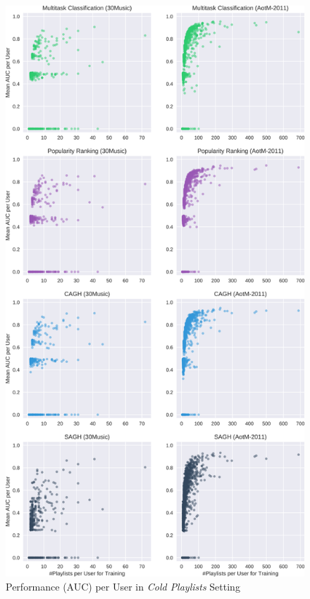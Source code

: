 \begin{figure}[!t]
    \centering
    \includegraphics[height=\textheight]{fig/auc_per_user1.png}
    \caption{Performance (AUC) per User in \emph{Cold Playlists} Setting}
\end{figure}

